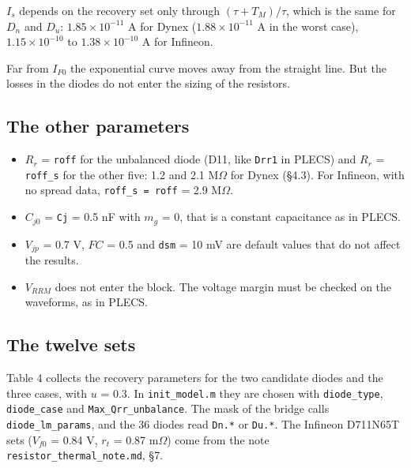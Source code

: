 \documentclass[11pt,a4paper,numbers=noenddot]{scrartcl}
\providecommand{\tightlist}{\setlength{\itemsep}{0pt}\setlength{\parskip}{0pt}}
\begin{document}
\begin{onehalfspace}
\(I_s\) depends on the recovery set only through \((\tau + T_M)/\tau\), which is the same for \(D_n\) and \(D_u\): \(1.85 \times 10^{-11}\) A for Dynex (\(1.88 \times 10^{-11}\) A in the worst case), \(1.15 \times 10^{-10}\) to \(1.38 \times 10^{-10}\) A for Infineon.

Far from \(I_{F0}\) the exponential curve moves away from the straight line. But the losses in the diodes do not enter the sizing of the resistors.

\subsection{The other parameters}\label{the-other-parameters}

\begin{itemize}
\tightlist
\item
  \(R_r\) = \texttt{roff} for the unbalanced diode (D11, like \texttt{Drr1} in PLECS) and \(R_r\) = \texttt{roff\_s} for the other five: 1.2 and 2.1 M\(\Omega\) for Dynex (\S4.3). For Infineon, with no spread data, \texttt{roff\_s\ =\ roff} = 2.9 M\(\Omega\).
\item
  \(C_{j0}\) = \texttt{Cj} = 0.5 nF with \(m_g\) = 0, that is a constant capacitance as in PLECS.
\item
  \(V_{jp}\) = 0.7 V, \(FC\) = 0.5 and \texttt{dsm} = 10 mV are default values that do not affect the results.
\item
  \(V_{RRM}\) does not enter the block. The voltage margin must be checked on the waveforms, as in PLECS.
\end{itemize}

\subsection{The twelve sets}\label{the-twelve-sets}

Table 4 collects the recovery parameters for the two candidate diodes and the three cases, with \(u\) = 0.3. In \texttt{init\_model.m} they are chosen with \texttt{diode\_type}, \texttt{diode\_case} and \texttt{Max\_Qrr\_unbalance}. The mask of the bridge calls \texttt{diode\_lm\_params}, and the 36 diodes read \texttt{Dn.*} or \texttt{Du.*}. The Infineon D711N65T sets (\(V_{f0}\) = 0.84 V, \(r_t\) = 0.87 m\(\Omega\)) come from the note \texttt{resistor\_\allowbreak{}thermal\_\allowbreak{}note.md}, \S7.


\end{onehalfspace}
\end{document}
